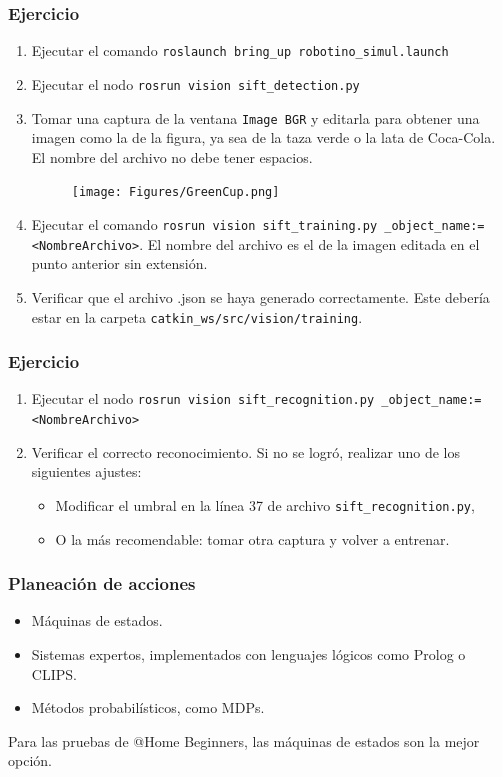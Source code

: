 \documentclass[10pt,spanish,aspectratio=1610]{beamer}
\begin{document}
\begin{frame}\frametitle{Ejercicio}
  \begin{enumerate}
  \item Ejecutar el comando \texttt{roslaunch bring\_up robotino\_simul.launch}
  \item Ejecutar el nodo \texttt{rosrun vision sift\_detection.py}
  \item Tomar una captura de la ventana \texttt{Image BGR} y editarla para obtener una imagen como la de la figura, ya sea de la taza verde o la lata de Coca-Cola. El nombre del archivo no debe tener espacios.
    \begin{figure}
      \centering
      \texttt{[image: Figures/GreenCup.png]}
    \end{figure}
  \item Ejecutar el comando \texttt{rosrun vision sift\_training.py \_object\_name:=<NombreArchivo>}. El nombre del archivo es el de la imagen editada en el punto anterior sin extensión.
    \item Verificar que el archivo .json se haya generado correctamente. Este debería estar en la carpeta \texttt{catkin\_ws/src/vision/training}.
  \end{enumerate}
\end{frame}

\begin{frame}\frametitle{Ejercicio}
  \begin{enumerate}
  \item Ejecutar el nodo \texttt{rosrun vision sift\_recognition.py \_object\_name:=<NombreArchivo>}
  \item Verificar el correcto reconocimiento. Si no se logró, realizar uno de los siguientes ajustes:
    \begin{itemize}
    \item Modificar el umbral en la línea 37 de archivo \texttt{sift\_recognition.py},
      \item O la más recomendable: tomar otra captura y volver a entrenar. 
    \end{itemize}
  \end{enumerate}
\end{frame}

\begin{frame}\frametitle{Planeación de acciones}
  \begin{itemize}
  \item Máquinas de estados.
  \item Sistemas expertos, implementados con lenguajes lógicos como Prolog o CLIPS.
  \item Métodos probabilísticos, como MDPs.
  \end{itemize}
  Para las pruebas de @Home Beginners, las máquinas de estados son la mejor opción.
\end{frame}
\end{document}
